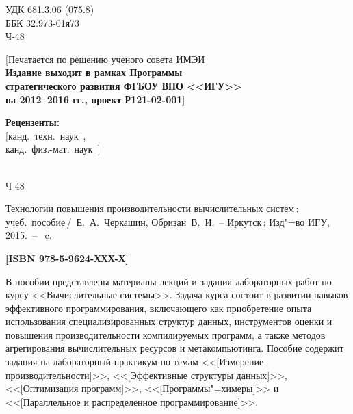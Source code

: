 \documentclass[14pt, a4paper, openany, twoside, final]{extbook} %
\newcommand{\e}[2][fcolor]{\textcolor{pcolor}{[}\textcolor{#1}{#2}\textcolor{pcolor}{]}}
\begin{document}
\newpage
\begin{mygroup}
\thispagestyle{empty}
\noindent УДК 681.3.06 (075.8)\\ %

\noindent ББК 32.973-01я73\\ %

\noindent\mbox{}\hspace{2em}Ч-48 %

\begin{center}\small
\e{Печатается по решению ученого совета ИМЭИ\\[2ex]
\bfseries Издание выходит в рамках Программы\\
стратегического развития ФГБОУ ВПО <<ИГУ>>\\
на 2012--2016 гг., проект Р121-02-001}
\end{center}
\vspace{1ex}
\begin{center}\small
\textbf{Рецензенты:} \\
\e{канд.~техн.~наук~{\em },\\ канд.~физ.-мат.~наук~{\em }}
\end{center}
\vfill
\noindent\begin{minipage}[t]{2em}
\noindent\mbox{}\\
Ч-48
\end{minipage}%
\begin{minipage}[t]{0.95\linewidth}
\setlength{\parindent}{5ex}

Технологии повышения производительности вычислительных систем\,{}: учеб.~пособие\,/~Е.~А.~Черкашин, Обризан~В.~И.~-- Иркутск\,: Изд"=во ИГУ, 2015.~-- \pageref{lastpage}~c.

{\bfseries \e{ISBN 978-5-9624-ХХХ-Х}}
\vspace{2ex}

\begingroup\small\parskip0pt
\vspace{1ex} В пособии представлены материалы лекций и задания лабораторных работ по курсу <<Вычислительные системы>>.  Задача курса состоит в развитии навыков эффективного программирования, включающего как приобретение опыта использования специализированных структур данных, инструментов оценки и повышения производительности компилируемых программ, а также методов агрегирования вычислительных ресурсов и метакомпьютинга.  Пособие содержит задания на лабораторный практикум по темам <<\e{Измерение производительности}>>, <<\e{Эффективные структуры данных}>>, <<\e{Оптимизация программ}>>, <<\e{Программы"=химеры}>> и <<\e{Параллельное и распределенное программирование}>>.


\end{minipage}
\end{mygroup}
\end{document}
